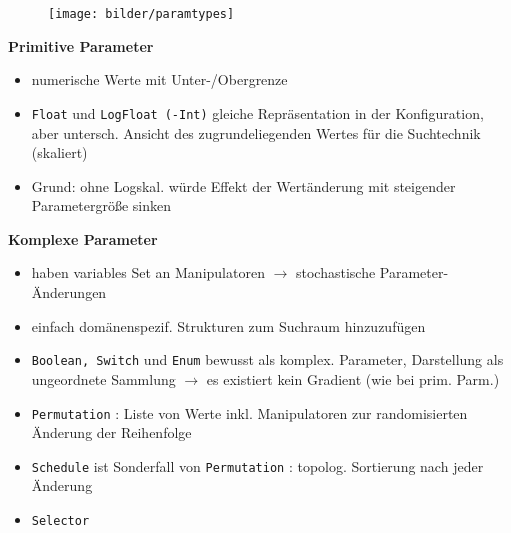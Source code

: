   \begin{frame}
    \begin{figure}[ht]
      \centering	      
      \texttt{[image: bilder/paramtypes]}
      \label{paramtypes}
    \end{figure}
    
  \textbf{Primitive Parameter}
  \begin{itemize}
    \item numerische Werte mit Unter-/Obergrenze
    \item \texttt{Float} und \texttt{LogFloat (-Int)} gleiche Repräsentation in der Konfiguration, aber 
    untersch. Ansicht des zugrundeliegenden Wertes für die Suchtechnik (skaliert)
    \item Grund: ohne Logskal. würde Effekt der Wertänderung mit steigender Parametergröße sinken
  \end{itemize}
  \end{frame}
  
  \begin{frame}
    \textbf{Komplexe Parameter}
    \begin{itemize}
      \item haben variables Set an Manipulatoren $\rightarrow$ stochastische Parameter-Änderungen
      \item einfach domänenspezif. Strukturen zum Suchraum hinzuzufügen
      \item \texttt{Boolean, Switch} und \texttt{Enum} bewusst als komplex. Parameter, Darstellung
      als ungeordnete Sammlung $\rightarrow$ es existiert kein Gradient (wie bei prim. Parm.)
      \item \texttt{Permutation} : Liste von Werte inkl. Manipulatoren zur randomisierten Änderung der Reihenfolge
      \item \texttt{Schedule} ist Sonderfall von \texttt{Permutation} : topolog. Sortierung nach jeder Änderung
      \item \texttt{Selector}
    \end{itemize}
  \end{frame}
  
